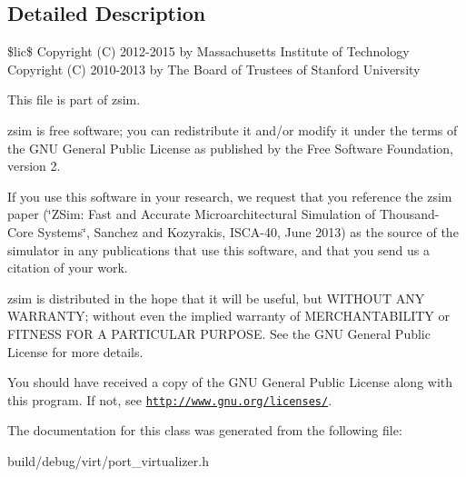 \subsection{Detailed Description}
\$lic\$ Copyright (C) 2012-\/2015 by Massachusetts Institute of Technology Copyright (C) 2010-\/2013 by The Board of Trustees of Stanford University

This file is part of zsim.

zsim is free software; you can redistribute it and/or modify it under the terms of the G\-N\-U General Public License as published by the Free Software Foundation, version 2.

If you use this software in your research, we request that you reference the zsim paper (\char`\"{}\-Z\-Sim\-: Fast and Accurate Microarchitectural Simulation of
\-Thousand-\/\-Core Systems\char`\"{}, Sanchez and Kozyrakis, I\-S\-C\-A-\/40, June 2013) as the source of the simulator in any publications that use this software, and that you send us a citation of your work.

zsim is distributed in the hope that it will be useful, but W\-I\-T\-H\-O\-U\-T A\-N\-Y W\-A\-R\-R\-A\-N\-T\-Y; without even the implied warranty of M\-E\-R\-C\-H\-A\-N\-T\-A\-B\-I\-L\-I\-T\-Y or F\-I\-T\-N\-E\-S\-S F\-O\-R A P\-A\-R\-T\-I\-C\-U\-L\-A\-R P\-U\-R\-P\-O\-S\-E. See the G\-N\-U General Public License for more details.

You should have received a copy of the G\-N\-U General Public License along with this program. If not, see \href{http://www.gnu.org/licenses/}{\tt http\-://www.\-gnu.\-org/licenses/}. 

The documentation for this class was generated from the following file\-:\begin{DoxyCompactItemize}
\item 
build/debug/virt/port\-\_\-virtualizer.\-h\end{DoxyCompactItemize}
